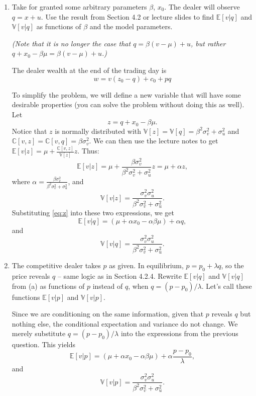 \documentclass[11pt
]{exam}
\begin{document}
\begin{enumerate}[label=(\alph*). ]
\item Take for granted some arbitrary parameters $\beta$, $x_{0}$. The dealer will observe $q=x+u$. 
Use the result from Section 4.2 or lecture slides to find $\mathbb{E}[v|q]$ and $\mathbb{V}[v|q]$ as functions of $\beta$ and the model parameters.

\emph{(Note that it is no longer the case that $q = \beta(v-\mu)+u$, but rather $q+x_{0}-\beta \mu = \beta(v-\mu)+u$.)}

\begin{solution}
The dealer wealth at the end of the trading day is
\[
w = v(z_{0}-q) + c_{0} + pq
\]

To simplify the problem, we will define a new variable that will have some desirable properties (you can solve the problem without doing this as well). Let 
\begin{equation} \label{eq:z}
z=q+x_{0}-\beta \mu.
\end{equation}
 Notice that $z$ is normally distributed with $\mathbb{V}[z]=\mathbb{V}[q]=\beta^{2}\sigma^{2}_{v}+\sigma^{2}_{u}$ and $\mathbb{C}[v,z]=\mathbb{C}[v,q]=\beta \sigma^{2}_{v}$. We can then use the lecture notes to get $\mathbb{E}[v|z]=\mu+\frac{\mathbb{C}[v,z]}{\mathbb{V}[z]}z$. Thus:
\[
\mathbb{E}[v|z] = \mu+\frac{\beta \sigma^{2}_{v}}{\beta^{2}\sigma^{2}_{v}+\sigma^{2}_{u}} z =\mu + \alpha z,
\]
where $\alpha = \frac{\beta \sigma^{2}_{v}}{\beta^{2}\sigma^{2}_{v}+\sigma^{2}_{u}}$, and
\[
\mathbb{V}[v|z]=\frac{\sigma^{2}_{v}\sigma_{u}^{2}}{\beta^{2}\sigma^{2}_{v}+\sigma^{2}_{u}}.
\]
Substituting \eqref{eq:z} into these two expressions, we get 
\[
\mathbb{E}[v|q] = (\mu + \alpha x_{0} - \alpha \beta \mu)  + \alpha q,
\]
and 
\[
\mathbb{V}[v|q]=\frac{\sigma^{2}_{v}\sigma_{u}^{2}}{\beta^{2}\sigma^{2}_{v}+\sigma^{2}_{u}}.
\]
\end{solution}


\item The competitive dealer takes $p$ as given. In equilibrium, $p=p_{0}+\lambda q$, so the price reveals $q$ -- same logic as in Section 4.2.4. Rewrite $\mathbb{E}[v|q]$ and $\mathbb{V}[v|q]$ from (a) as functions of $p$ instead of $q$, when $q=(p-p_{0})/\lambda$. Let's call these functions $\mathbb{E}[v|p]$ and $\mathbb{V}[v|p]$.

\begin{solution}
Since we are conditioning on the same information, given that $p$ reveals $q$ but nothing else, the conditional expectation and variance do not change. We merely substitute $q=(p-p_{0})/\lambda$ into the expressions from the previous question. This yields
\[
\mathbb{E}[v|p] =  (\mu + \alpha x_{0} - \alpha \beta \mu) +\alpha \frac{p-p_{0}}{\lambda},
\]
and
\[
\mathbb{V}[v|p]=\frac{\sigma^{2}_{v}\sigma_{u}^{2}}{\beta^{2}\sigma^{2}_{v}+\sigma^{2}_{u}}.
\]
\end{solution}


\end{enumerate}
\end{document}
